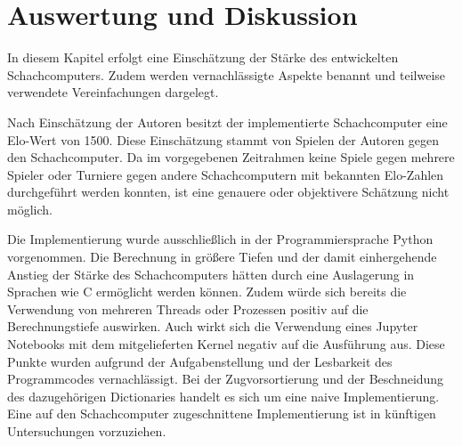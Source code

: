 \section{Auswertung und Diskussion} \label{ch:evaluation-discussion}

In diesem Kapitel erfolgt eine Einschätzung der Stärke des entwickelten Schachcomputers.
Zudem werden vernachlässigte Aspekte benannt und teilweise verwendete Vereinfachungen dargelegt.

Nach Einschätzung der Autoren besitzt der implementierte Schachcomputer eine Elo-Wert von 1500.
Diese Einschätzung stammt von Spielen der Autoren gegen den Schachcomputer.
Da im vorgegebenen Zeitrahmen keine Spiele gegen mehrere Spieler oder Turniere gegen andere Schachcomputern mit bekannten Elo-Zahlen durchgeführt werden konnten, ist eine genauere oder objektivere Schätzung nicht möglich.

Die Implementierung wurde ausschließlich in der Programmiersprache Python vorgenommen.
Die Berechnung in größere Tiefen und der damit einhergehende Anstieg der Stärke des Schachcomputers hätten durch eine Auslagerung in Sprachen wie C ermöglicht werden können.
Zudem würde sich bereits die Verwendung von mehreren Threads oder Prozessen positiv auf die Berechnungstiefe auswirken.
Auch wirkt sich die Verwendung eines Jupyter Notebooks mit dem mitgelieferten Kernel negativ auf die Ausführung aus.
Diese Punkte wurden aufgrund der Aufgabenstellung und der Lesbarkeit des Programmcodes vernachlässigt.
Bei der Zugvorsortierung und der Beschneidung des dazugehörigen Dictionaries handelt es sich um eine naive Implementierung.
Eine auf den Schachcomputer zugeschnittene Implementierung ist in künftigen Untersuchungen vorzuziehen.
